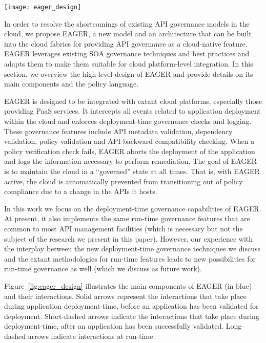 \begin{figure*}[t]
\centering
\texttt{[image: eager\_design]}
\caption{EAGER Architecture
\label{fig:eager_design}
}
\end{figure*}

In order to resolve the shortcomings of existing API governance models in the
cloud, we propose EAGER, a new model and an architecture that can be built
into the cloud fabrics for providing API governance as a cloud-native feature.
EAGER leverages existing SOA governance techniques and 
best practices and adapts them to make them
suitable for cloud platform-level integration.
In this section, we
overview the high-level design of EAGER and provide details on its main
components and the policy language.

EAGER is designed to be integrated with extant cloud platforms, 
especially those providing PaaS services. 
It intercepts all events related to application deployment within the cloud
and enforces deployment-time governance checks and
logging. 
These governance features include API metadata validation, 
dependency validation, policy validation and 
API backward compatibility
checking. When a policy verification check fails, 
EAGER aborts the deployment of the application and logs the information
necessary to perform remediation.  The goal of EAGER is to maintain the cloud
in a ``governed'' state at all times.  That is, with EAGER active, the cloud
is
automatically prevented from transitioning out of policy compliance due to a
change in the APIs it hosts.

In this work we focus on the deployment-time governance capabilities of EAGER. 
At present, it also implements the same run-time governance features that are
common to most API management facilities (which is necessary but not the
subject of the research we present in this paper).
However, our experience with the interplay between the new deployment-time
governance techniques we discuss and the extant methodologies for run-time
features leads to new possibilities for run-time governance as well (which we
discuss as future work).


Figure~\ref{fig:eager_design} illustrates the main components of EAGER (in
blue) and their interactions. Solid arrows represent the interactions that take place
during application deployment-time, before an application has been validated
for deployment. Short-dashed arrows indicate the interactions that take place
during deployment-time, after an application has been successfully validated.
Long-dashed arrows indicate interactions at run-time.

